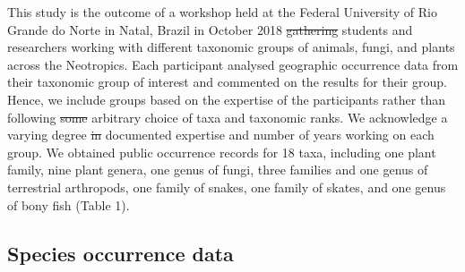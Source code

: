\documentclass[fleqn,10pt,lineno]{wlpeerj} %
\providecommand{\DIFaddtex}[1]{{\protect\color{blue}\uwave{#1}}} %
\providecommand{\DIFdeltex}[1]{{\protect\color{red}\sout{#1}}}                      %
\providecommand{\DIFaddbegin}{} %
\providecommand{\DIFaddend}{} %
\providecommand{\DIFdelbegin}{} %
\providecommand{\DIFdelend}{} %
\providecommand{\DIFadd}[1]{\texorpdfstring{\DIFaddtex{#1}}{#1}} %
\providecommand{\DIFdel}[1]{\texorpdfstring{\DIFdeltex{#1}}{}} %
\begin{document}
This study is the outcome of a workshop held at the Federal University of Rio Grande do Norte in Natal, Brazil in October 2018 \DIFdelbegin \DIFdel{gathering }\DIFdelend \DIFaddbegin \DIFadd{which gathered }\DIFaddend students and researchers working with different taxonomic groups of animals, fungi, and plants across the Neotropics. Each participant analysed geographic occurrence data from their taxonomic group of interest and commented on the results for their group. Hence, we include groups based on the expertise of the participants rather than following \DIFdelbegin \DIFdel{some }\DIFdelend \DIFaddbegin \DIFadd{an }\DIFaddend arbitrary choice of taxa and taxonomic ranks. We acknowledge a varying degree \DIFdelbegin \DIFdel{in }\DIFdelend \DIFaddbegin \DIFadd{of }\DIFaddend documented expertise and number of years working on each group. We obtained public occurrence records for 18 taxa, including one plant family, nine plant genera, one genus of fungi, three families and one genus of terrestrial arthropods, one family of snakes, one family of skates, and one genus of bony fish (Table 1).

\hypertarget{species-occurrence-data}{%
\subsection*{Species occurrence data}\label{species-occurrence-data}}
\end{document}
